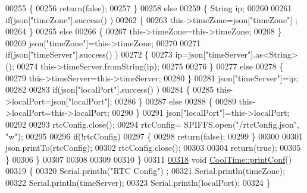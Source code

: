 \begin{DoxyCode}
00255         \{
00256               \textcolor{keywordflow}{return}(\textcolor{keyword}{false});
00257         \} 
00258         \textcolor{keywordflow}{else}
00259         \{   String ip;
00260             
00261             \textcolor{keywordflow}{if}(json[\textcolor{stringliteral}{"timeZone"}].success() )
00262             \{
00263                 this->timeZone=json[\textcolor{stringliteral}{"timeZone"}] ;
00264             \}
00265             \textcolor{keywordflow}{else}
00266             \{
00267                 this->timeZone=this->timeZone;          
00268             \}
00269             json[\textcolor{stringliteral}{"timeZone"}]=this->timeZone;
00270             
00271             \textcolor{keywordflow}{if}(json[\textcolor{stringliteral}{"timeServer"}].success() )
00272             \{           
00273                  ip=json[\textcolor{stringliteral}{"timeServer"}].as<String>();
00274                 this->timeServer.fromString(ip);
00275                 
00276             \}
00277             \textcolor{keywordflow}{else}
00278             \{
00279                 this->timeServer=this->timeServer;
00280             \}
00281             json[\textcolor{stringliteral}{"timeServer"}]=ip;
00282             
00283             \textcolor{keywordflow}{if}(json[\textcolor{stringliteral}{"localPort"}].success() )
00284             \{                       
00285                 this->localPort=json[\textcolor{stringliteral}{"localPort"}];
00286             \}
00287             \textcolor{keywordflow}{else}
00288             \{
00289                 this->localPort=this->localPort;
00290             \}
00291             json[\textcolor{stringliteral}{"localPort"}]=this->localPort;
00292 
00293             rtcConfig.close();
00294             rtcConfig= SPIFFS.open(\textcolor{stringliteral}{"/rtcConfig.json"}, \textcolor{stringliteral}{"w"});
00295             
00296             \textcolor{keywordflow}{if}(!rtcConfig)
00297             \{
00298                 \textcolor{keywordflow}{return}(\textcolor{keyword}{false});
00299             \}
00300             
00301             json.printTo(rtcConfig);
00302             rtcConfig.close();
00303                         
00304             \textcolor{keywordflow}{return}(\textcolor{keyword}{true}); 
00305         \}
00306     \}   
00307 
00308 
00309 
00310 \}
00311 
\hyperlink{class_cool_time_af355e7f9b3898211cd2ff25eab5933b1}{00318} \textcolor{keywordtype}{void} \hyperlink{class_cool_time_af355e7f9b3898211cd2ff25eab5933b1}{CoolTime::printConf}()
00319 \{
00320     Serial.println(\textcolor{stringliteral}{"RTC Config"}) ;
00321     Serial.println(timeZone);
00322     Serial.println(timeServer);
00323     Serial.println(localPort);
00324 \}
\end{DoxyCode}
